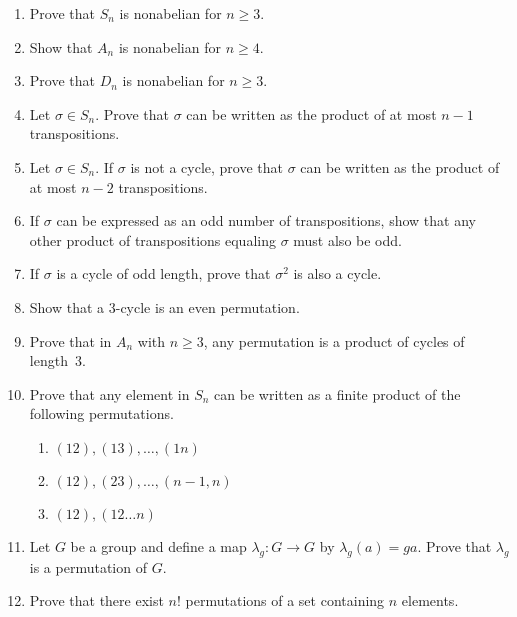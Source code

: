{\begin{enumerate}
 
\item
Prove that $S_n$ is nonabelian for $n \geq 3$.
 
 
\item
Show that $A_n$ is nonabelian for $n \geq 4$.
 
 
\item
Prove that $D_n$ is nonabelian for $n \geq 3$.
 
 
\item
Let $\sigma \in S_n$. Prove that $\sigma$ can be written as the
product of at most $n-1$ transpositions. 
 
 
\item
Let $\sigma \in S_n$. If $\sigma$ is not a cycle, prove that $\sigma$
can be written as the product of at most $n-2$ transpositions.
 
 
\item
If $\sigma$ can be expressed as an odd number of transpositions, show
that any other product of transpositions equaling $\sigma$ must also
be odd. 
 
 
\item
If $\sigma$ is a cycle of odd length, prove that $\sigma^2$ is also a
cycle. 
 
 
\item
Show that a 3-cycle is an even permutation.
 
 
\item
Prove that in $A_n$ with $n \geq 3$, any permutation is a product of
cycles of length~3.  
 
 
\item
Prove that any element in $S_n$ can be written as a finite product of
the following permutations.
\begin{enumerate}
 
 \item
$(1 2), (13), \ldots, (1n)$
 
 \item
$(1 2), (23), \ldots, (n- 1,n)$
 
 \item
$(12), (1 2 \ldots n )$
 
\end{enumerate}
 
 
\item
Let $G$ be a group and define a map $\lambda_g : G \rightarrow G$ by
$\lambda_g(a) = g a$.  Prove that $\lambda_g$ is a permutation of $G$.
 
 
 
\item
Prove that there exist $n!$ permutations of a set containing $n$
elements. 
 

\end{enumerate}}

